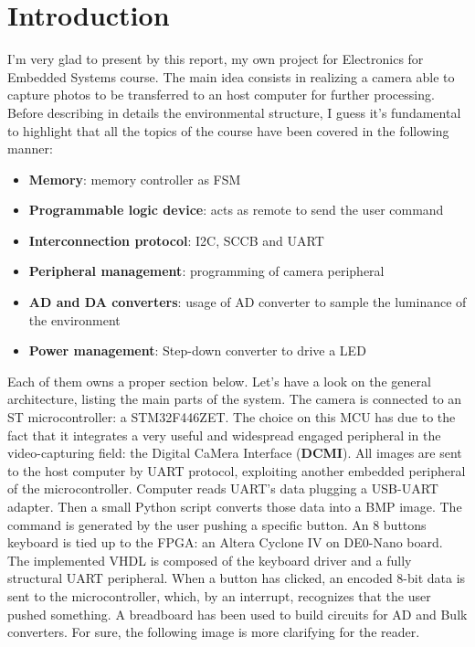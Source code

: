 \section{Introduction}
I'm very glad to present by this report, my own project for Electronics for Embedded Systems course. The main idea consists in  realizing a camera able to capture photos to be transferred to an host computer for further processing. Before describing in details the environmental structure, I guess it's fundamental to highlight that all the topics of the course have been covered in the following manner:
\begin{itemize}
\item \textbf{Memory}: memory controller as FSM
\item \textbf{Programmable logic device}: acts as remote to send the user command
\item \textbf{Interconnection protocol}: I2C, SCCB and UART
\item \textbf{Peripheral management}: programming of camera peripheral
\item \textbf{AD and DA converters}: usage of AD converter to sample the luminance of the environment
\item \textbf{Power management}: Step-down converter to drive a LED
\end{itemize}
Each of them owns a proper section below.
\newline
Let's have a look on the general architecture, listing the main parts of the system. The camera is connected to an ST microcontroller: a STM32F446ZET. The choice on this MCU has due to the fact that it integrates a very useful and widespread engaged peripheral in the video-capturing field: the Digital CaMera Interface (\textbf{DCMI}). All images are sent to the host computer by UART protocol, exploiting another embedded peripheral of the microcontroller. Computer reads UART's data plugging a USB-UART adapter.  Then a small Python script converts those data into a BMP image. 
\newline
The command is generated by the user pushing a specific button. An 8 buttons keyboard is tied up to the FPGA: an Altera Cyclone IV on DE0-Nano board. The implemented VHDL is composed of the keyboard driver and a fully structural UART peripheral. When a button has clicked, an encoded 8-bit data is sent to the microcontroller, which, by an interrupt, recognizes that the user pushed something. 
\newline
A breadboard has been used to build circuits for AD and Bulk converters. For sure, the following image is more clarifying for the reader.
